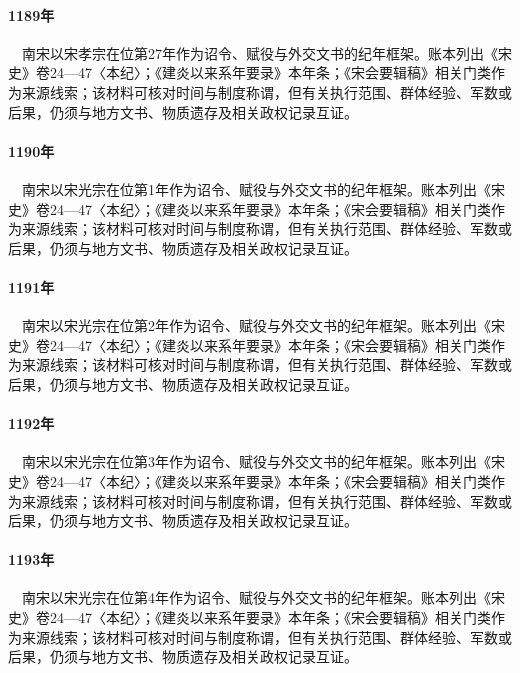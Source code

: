 \paragraph{1189年}　南宋以宋孝宗在位第27年作为诏令、赋役与外交文书的纪年框架。账本列出《宋史》卷24—47〈本纪〉；《建炎以来系年要录》本年条；《宋会要辑稿》相关门类作为来源线索；该材料可核对时间与制度称谓，但有关执行范围、群体经验、军数或后果，仍须与地方文书、物质遗存及相关政权记录互证。

\paragraph{1190年}　南宋以宋光宗在位第1年作为诏令、赋役与外交文书的纪年框架。账本列出《宋史》卷24—47〈本纪〉；《建炎以来系年要录》本年条；《宋会要辑稿》相关门类作为来源线索；该材料可核对时间与制度称谓，但有关执行范围、群体经验、军数或后果，仍须与地方文书、物质遗存及相关政权记录互证。

\paragraph{1191年}　南宋以宋光宗在位第2年作为诏令、赋役与外交文书的纪年框架。账本列出《宋史》卷24—47〈本纪〉；《建炎以来系年要录》本年条；《宋会要辑稿》相关门类作为来源线索；该材料可核对时间与制度称谓，但有关执行范围、群体经验、军数或后果，仍须与地方文书、物质遗存及相关政权记录互证。

\paragraph{1192年}　南宋以宋光宗在位第3年作为诏令、赋役与外交文书的纪年框架。账本列出《宋史》卷24—47〈本纪〉；《建炎以来系年要录》本年条；《宋会要辑稿》相关门类作为来源线索；该材料可核对时间与制度称谓，但有关执行范围、群体经验、军数或后果，仍须与地方文书、物质遗存及相关政权记录互证。

\paragraph{1193年}　南宋以宋光宗在位第4年作为诏令、赋役与外交文书的纪年框架。账本列出《宋史》卷24—47〈本纪〉；《建炎以来系年要录》本年条；《宋会要辑稿》相关门类作为来源线索；该材料可核对时间与制度称谓，但有关执行范围、群体经验、军数或后果，仍须与地方文书、物质遗存及相关政权记录互证。

